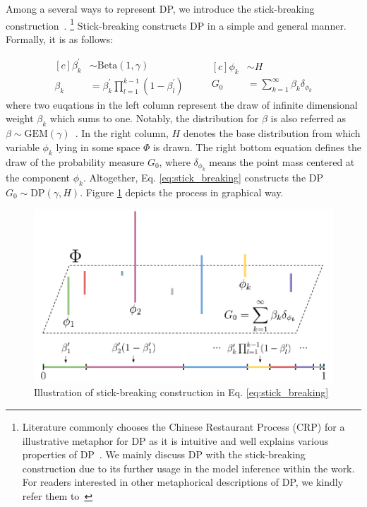 \documentclass{article}
\begin{document}
Among a several ways to represent DP, we introduce the stick-breaking construction~\cite{sethuraman94}.
\footnote{Literature commonly chooses the Chinese Restaurant Process (CRP) for a illustrative metaphor for DP as it is intuitive and well explains various properties of DP~\cite{DBLP:reference/ml/Teh17}. We mainly discuss DP with the stick-breaking construction due to its further usage in the model inference within the work. For readers interested in other metaphorical descriptions of DP, we kindly refer them to~\cite{DBLP:reference/ml/Teh17, DBLP:conf/ismir/HoffmanBC08}}
Stick-breaking constructs DP in a simple and general manner. Formally, it is as follows:

\begin{equation}\label{eq:stick_breaking}
\begin{aligned}[c]
    \beta^{\prime}_{k} &\sim \text{Beta}(1, \gamma) \\
    \beta_{k} &= \beta^{\prime}_{k} \prod_{l=1}^{k-1} (1 - \beta_{l}^{\prime})
\end{aligned}
\qquad
\begin{aligned}[c]
    \phi_{k} &\sim H \\
    G_{0} &= \sum^{\infty}_{k=1} \beta_{k}\delta_{\phi_{k}}
\end{aligned}
\end{equation}
where two euqations in the left column represent the draw of infinite dimensional weight $\beta_{k}$ which sums to one. Notably, the distribution for $\beta$ is also referred as $\beta \sim \text{GEM}(\gamma)$~\cite{DBLP:journals/cpc/Pitman02}. In the right column, $H$ denotes the base distribution from which variable $\phi_{k}$ lying in some space $\Phi$ is drawn. The right bottom equation defines the draw of the probability measure $G_{0}$, where $\delta_{\phi_{k}}$ means the point mass centered at the component $\phi_{k}$. Altogether, Eq. \ref{eq:stick_breaking} constructs the DP $G_{0} \sim \text{DP}(\gamma, H)$. Figure \ref{fig:stick_breaking} depicts the process in graphical way.

\begin{figure}[ht]
    \centering
    \includegraphics[width=0.9\linewidth]{figs/stick-breaking.pdf}
    \caption{Illustration of stick-breaking construction in Eq. \ref{eq:stick_breaking}}
    \label{fig:stick_breaking}
\end{figure}
\end{document}

